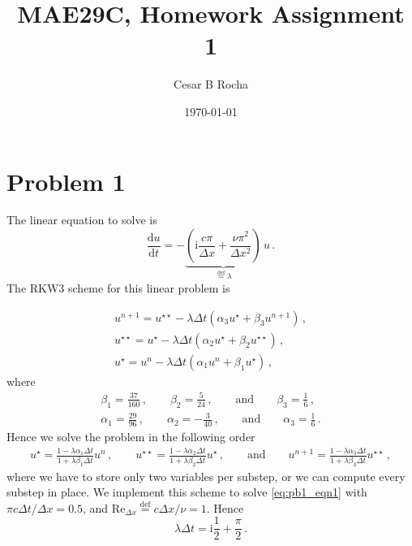 \documentclass[11pt]{article}
\title{MAE29C, Homework Assignment 1}
\author{Cesar B Rocha}
\date{\today}
\newcommand{\defn}{\stackrel{\text{def}}{=}}
\newcommand{\ii}{\mathrm{i}}
\newcommand{\dd}{\mathrm{d}}
\newcommand{\dstar}{{\star\star}}
\newcommand{\dt}{\Delta t}
\newcommand{\dx}{\Delta x}
\newcommand{\com}{\, ,}
\newcommand{\per}{\, .}
\newcommand{\qqand}{\qquad \text{and} \qquad}
\def\beq{\begin{equation}}
\def\eeq{\end{equation}}
\begin{document}
\maketitle

\section*{Problem 1}
The linear equation to solve is
\beq
\label{eq:pb1_eqn1}
\frac{\dd u}{\dd t} = -\underbrace{\left(\ii \frac{c \pi}{\Delta x} + \frac{\nu \pi^2}{\Delta x^2}\right)}_{\defn \lambda}\,u\per
\eeq
The RKW3 scheme for this linear problem is

\begin{align}
u^{n+1} = u^\dstar - \lambda \dt(\alpha_3 u^\star + \beta_3 u^{n+1})\com \nonumber \\
u^\dstar = u^\star - \lambda \dt(\alpha_2 u^\star + \beta_2 u^\dstar)\com \nonumber \\
u^\star = u^n - \lambda \dt (\alpha_1 u^n + \beta_1 u^\star)\com
\end{align}
where
\begin{align}
\beta_1 = \frac{37}{160}\com\qquad \beta_2 = \frac{5}{24}\com\qqand \beta_3 = \frac{1}{6}\com \nonumber \\
\alpha_1 = \frac{29}{96}\com\qquad \alpha_2 = -\frac{3}{40}\com\qqand \alpha_3 = \frac{1}{6}\per
\end{align}
Hence we solve the problem in the following order\begin{align}
u^\star = \frac{1 - \lambda \alpha_1 \dt}{1+\lambda \beta_1 \dt} u^n \com\qquad u^\dstar = \frac{1 - \lambda \alpha_2 \dt}{1+\lambda \beta_2 \dt} u^\star \com\qqand u^{n+1} = \frac{1 - \lambda \alpha_3 \dt}{1+\lambda \beta_3 \dt} u^\dstar \com
\end{align}
where  we have to store only two variables per substep, or we can compute every substep in place. We implement this scheme to solve \eqref{eq:pb1_eqn1} with $\pi c \dt/\dx = 0.5$, and $\text{Re}_{\dx} \defn c \dx/\nu = 1$. Hence
\beq
\lambda\dt = \ii \frac{1}{2} + \frac{\pi}{2}\per
\eeq
\end{document}
